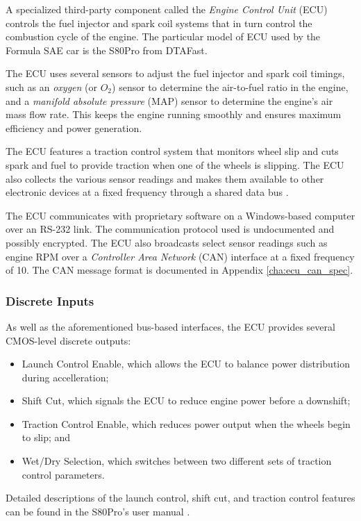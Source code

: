 
A specialized third-party component called the \emph{Engine Control Unit} (ECU) controls the fuel injector and spark coil systems that in turn control the combustion cycle of the engine. The particular model of ECU used by the Formula SAE car is the S80Pro from DTAFast.

The ECU uses several sensors to adjust the fuel injector and spark coil timings, such as an \emph{oxygen} (or \emph{$O_{2}$}) sensor to determine the air-to-fuel ratio in the engine, and a \emph{manifold absolute pressure} (MAP) sensor to determine the engine's air mass flow rate. This keeps the engine running smoothly and ensures maximum efficiency and power generation. 

The ECU features a traction control system that monitors wheel slip and cuts spark and fuel to provide traction when one of the wheels is slipping. The ECU also collects the various sensor readings and makes them available to other electronic devices at a fixed frequency through a shared data bus \cite{s80pro}.


The ECU communicates with proprietary software on a Windows-based computer over an RS-232 link. The communication protocol used is undocumented and possibly encrypted. The ECU also broadcasts select sensor readings such as engine RPM over a \emph{Controller Area Network} (CAN) interface at a fixed frequency of \unit{10}{\hertz}. The CAN message format is documented in Appendix \ref{cha:ecu_can_spec}.

\subsubsection{Discrete Inputs\label{sec:ecu_background_discrete_inputs}}

As well as the aforementioned bus-based interfaces, the ECU provides several CMOS-level discrete outputs:

\begin{itemize}
    \item Launch Control Enable, which allows the ECU to balance power distribution during accelleration;
    \item Shift Cut, which signals the ECU to reduce engine power before a downshift;
    \item Traction Control Enable, which reduces power output when the wheels begin to slip; and
    \item Wet/Dry Selection, which switches between two different sets of traction control parameters.
\end{itemize}

Detailed descriptions of the launch control, shift cut, and traction control features can be found in the S80Pro's user manual \cite{s80pro}.


